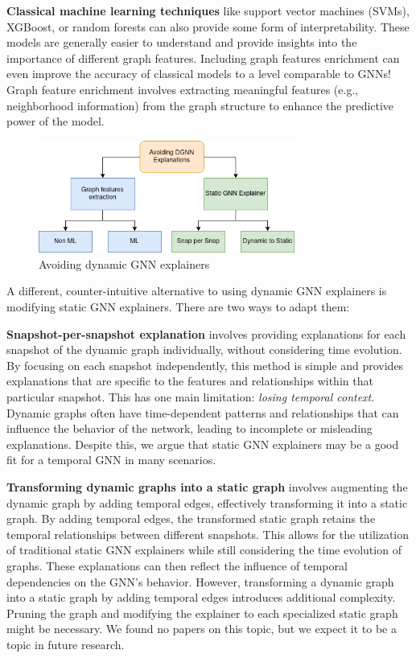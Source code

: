 \textbf{Classical machine learning techniques} like support vector machines (SVMs), XGBoost, or random forests can also provide some form of interpretability. These models are generally easier to understand and provide insights into the importance of different graph features. Including graph features enrichment can even improve the accuracy of classical models to a level comparable to GNNs\cite{rao_modelling_2022}! Graph feature enrichment involves extracting meaningful features (e.g., neighborhood information) from the graph structure to enhance the predictive power of the model.

\begin{figure}
    \centering 
    \includegraphics[width=0.75\textwidth]{images/avoiding-dgnn-diagram.png}
    \caption{Avoiding dynamic GNN explainers}
    \label{fig:avoiding-dgnn-diagram}
\end{figure}

A different, counter-intuitive alternative to using dynamic GNN explainers is modifying static GNN explainers. There are two ways to adapt them:

\textbf{Snapshot-per-snapshot explanation} involves providing explanations for each snapshot of the dynamic graph individually, without considering time evolution. By focusing on each snapshot independently, this method is simple and provides explanations that are specific to the features and relationships within that particular snapshot. This has one main limitation: \textit{losing temporal context}. Dynamic graphs often have time-dependent patterns and relationships that can influence the behavior of the network, leading to incomplete or misleading explanations. Despite this, we argue that static GNN explainers may be a good fit for a temporal GNN in many scenarios.

\textbf{Transforming dynamic graphs into a static graph} involves augmenting the dynamic graph by adding temporal edges, effectively transforming it into a static graph\cite{kim_temporal_2022}. By adding temporal edges, the transformed static graph retains the temporal relationships between different snapshots. This allows for the utilization of traditional static GNN explainers while still considering the time evolution of graphs. These explanations can then reflect the influence of temporal dependencies on the GNN's behavior. However, transforming a dynamic graph into a static graph by adding temporal edges introduces additional complexity. Pruning the graph and modifying the explainer to each specialized static graph might be necessary. We found no papers on this topic, but we expect it to be a topic in future research.

